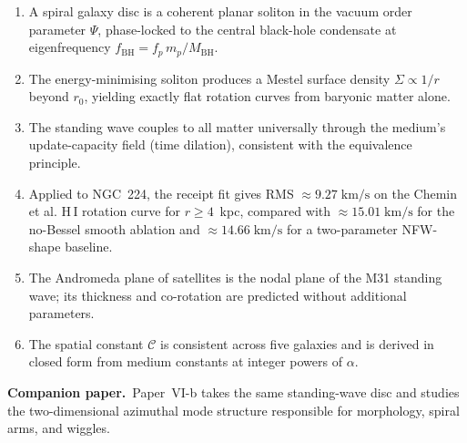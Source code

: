 \documentclass[11pt,a4paper]{article}
\begin{document}
\begin{enumerate}
  \item A spiral galaxy disc is a coherent planar soliton in the vacuum order parameter
    $\Psi$, phase-locked to the central black-hole condensate at eigenfrequency
    $f_\mathrm{BH} = f_p\,m_p/M_\mathrm{BH}$.

  \item The energy-minimising soliton produces a Mestel surface density $\Sigma \propto
    1/r$ beyond $r_0$, yielding exactly flat rotation curves from baryonic matter alone.

  \item The standing wave couples to all matter universally through the medium's
    update-capacity field (time dilation), consistent with the equivalence principle.

  \item Applied to NGC~224, the receipt fit gives RMS $\approx9.27\;\mathrm{km/s}$
    on the Chemin et al. H\,I rotation curve for $r\ge4$~kpc, compared with
    $\approx15.01\;\mathrm{km/s}$ for the no-Bessel smooth ablation and
    $\approx14.66\;\mathrm{km/s}$ for a two-parameter NFW-shape baseline.

  \item The Andromeda plane of satellites is the nodal plane of the M31 standing wave;
    its thickness and co-rotation are predicted without additional parameters.

  \item The spatial constant $\mathcal{C}$ is consistent across five galaxies and is
    derived in closed form from medium constants at integer powers of $\alpha$.
\end{enumerate}

\medskip
\noindent\textbf{Companion paper.}~Paper~VI-b takes the same standing-wave disc and
studies the two-dimensional azimuthal mode structure responsible for morphology, spiral
arms, and wiggles.
\end{document}
